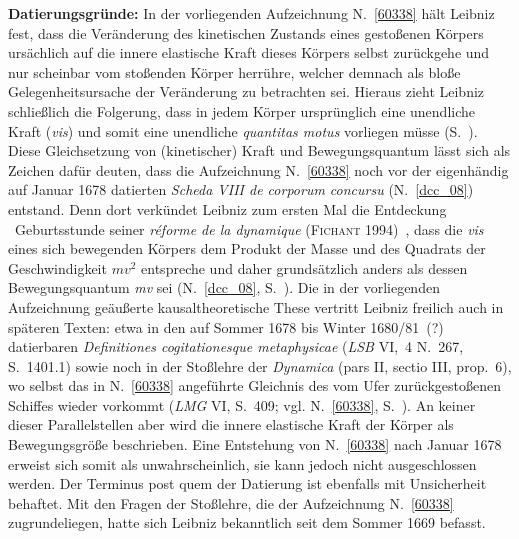 \begin{ledgroup}%
\footnotesize%
\pstart%
\noindent%
\textbf{Datierungsgründe:}
In der vorliegenden Aufzeichnung N.~\ref{60338} %
hält Leibniz fest, dass die Veränderung des kinetischen Zustands eines gestoßenen Körpers ursächlich auf die innere elastische Kraft dieses Körpers selbst zurückgehe und nur scheinbar vom stoßenden Körper herrühre, welcher demnach als bloße Gelegenheitsursache der Veränderung zu betrachten sei.
Hieraus zieht Leibniz schließlich die Folgerung, dass in jedem Körper ursprünglich eine unendliche Kraft (\textit{vis}) und somit eine unendliche \textit{quantitas motus} vorliegen müsse (S.~).
Diese Gleichsetzung von (kinetischer) Kraft und Bewegungsquantum lässt sich als Zeichen dafür deuten, dass die Aufzeichnung N.~\ref{60338} %
noch vor der eigenhändig auf Januar 1678 datierten \textit{Scheda VIII de corporum concursu} (N.~\ref{dcc_08}) entstand.
Denn dort verkündet Leibniz zum ersten Mal die Entdeckung
\textendash\ Geburtsstunde seiner \textit{réforme de la dynamique} (\textsc{Fichant} 1994\cite{01056})~\textendash,
dass die \textit{vis} eines sich bewegenden Körpers dem Produkt der Masse und des Quadrats der Geschwindigkeit $mv^2$ entspreche und daher grundsätzlich anders als dessen Bewegungsquantum \textit{mv} sei (N.~\ref{dcc_08}, S.~).
\pend%
%
\pstart%
Die in der vorliegenden Aufzeichnung geäußerte kausaltheoretische These vertritt Leibniz freilich auch in späteren Texten: etwa in den auf Sommer 1678 bis Winter 1680/81~(?) datierbaren \textit{Definitiones cogitationesque metaphysicae} (\textit{LSB} VI,~4 N.~267, S.~1401.1\cite{01339}) sowie noch in der Stoßlehre der \textit{Dynamica} (pars II, sectio III, prop.~6\cite{01354}), wo selbst das in N.~\ref{60338} angeführte Gleichnis des vom Ufer zurückgestoßenen Schiffes wieder vorkommt (\textit{LMG} VI, S.~409;\cite{01043} vgl. N.~\ref{60338}, S.~).
An keiner dieser Parallelstellen aber wird die innere elastische Kraft der Körper als Bewegungsgröße beschrieben.
Eine Entstehung von N.~\ref{60338} nach Januar 1678 erweist sich somit als unwahrscheinlich, sie kann jedoch nicht ausgeschlossen werden.
\pend%
\pstart%
Der Terminus post quem der Datierung ist ebenfalls mit Unsicherheit behaftet.
Mit den Fragen der Stoßlehre, die der Aufzeichnung N.~\ref{60338} %
zugrundeliegen, hatte sich Leibniz bekanntlich seit dem Sommer 1669 befasst.

\end{ledgroup}
